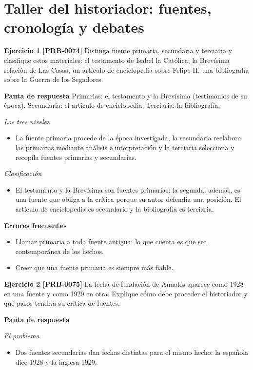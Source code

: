 \documentclass{book}
\begin{document}
\section{Taller del historiador: fuentes, cronología y debates}

\noindent\textbf{Ejercicio 1 [PRB-0074]}
Distinga fuente primaria, secundaria y terciaria y clasifique estos materiales: el testamento de Isabel la Católica, la Brevísima relación de Las Casas, un artículo de enciclopedia sobre Felipe II, una bibliografía sobre la Guerra de los Segadores.


\noindent\textbf{Pauta de respuesta}
Primarias: el testamento y la Brevísima (testimonios de su época). Secundaria: el artículo de enciclopedia. Terciaria: la bibliografía.


\noindent\textit{Los tres niveles}
\begin{itemize}
\item La fuente primaria procede de la época investigada, la secundaria reelabora las primarias mediante análisis e interpretación y la terciaria selecciona y recopila fuentes primarias y secundarias.
\end{itemize}

\noindent\textit{Clasificación}
\begin{itemize}
\item El testamento y la Brevísima son fuentes primarias: la segunda, además, es una fuente que obliga a la crítica porque su autor defendía una posición. El artículo de enciclopedia es secundario y la bibliografía es terciaria.
\end{itemize}

\noindent\textbf{Errores frecuentes}
\begin{itemize}
\item Llamar primaria a toda fuente antigua: lo que cuenta es que sea contemporánea de los hechos.
\item Creer que una fuente primaria es siempre más fiable.
\end{itemize}

\noindent\textbf{Ejercicio 2 [PRB-0075]}
La fecha de fundación de Annales aparece como 1928 en una fuente y como 1929 en otra. Explique cómo debe proceder el historiador y qué pasos tendría su crítica de fuentes.


\noindent\textbf{Pauta de respuesta}

\noindent\textit{El problema}
\begin{itemize}
\item Dos fuentes secundarias dan fechas distintas para el mismo hecho: la española dice 1928 y la inglesa 1929.
\end{itemize}
\end{document}
